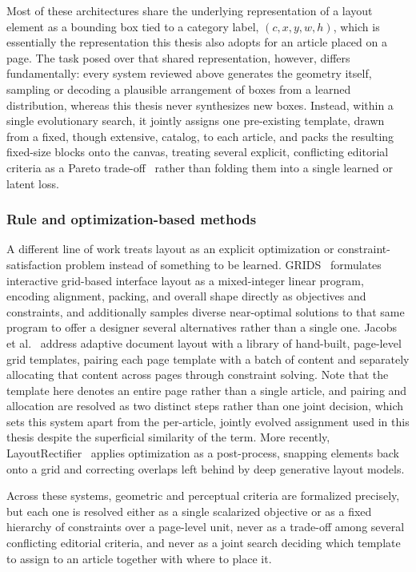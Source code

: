 Most of these architectures share the underlying representation of a layout element as a bounding box tied to a category label, $(c, x, y, w, h)$, which is essentially the representation this thesis also adopts for an article placed on a page. The task posed over that shared representation, however, differs fundamentally: every system reviewed above generates the geometry itself, sampling or decoding a plausible arrangement of boxes from a learned distribution, whereas this thesis never synthesizes new boxes. Instead, within a single evolutionary search, it jointly assigns one pre-existing template, drawn from a fixed, though extensive, catalog, to each article, and packs the resulting fixed-size blocks onto the canvas, treating several explicit, conflicting editorial criteria as a Pareto trade-off~\cite{pareto} rather than folding them into a single learned or latent loss.

\subsubsection{Rule and optimization-based methods}

A different line of work treats layout as an explicit optimization or constraint-satisfaction problem instead of something to be learned. GRIDS~\cite{Dayama-2020} formulates interactive grid-based interface layout as a mixed-integer linear program, encoding alignment, packing, and overall shape directly as objectives and constraints, and additionally samples diverse near-optimal solutions to that same program to offer a designer several alternatives rather than a single one. Jacobs et al.~\cite{jacobs-2003} address adaptive document layout with a library of hand-built, page-level grid templates, pairing each page template with a batch of content and separately allocating that content across pages through constraint solving. Note that the template here denotes an entire page rather than a single article, and pairing and allocation are resolved as two distinct steps rather than one joint decision, which sets this system apart from the per-article, jointly evolved assignment used in this thesis despite the superficial similarity of the term. More recently, LayoutRectifier~\cite{shen-2025} applies optimization as a post-process, snapping elements back onto a grid and correcting overlaps left behind by deep generative layout models.

Across these systems, geometric and perceptual criteria are formalized precisely, but each one is resolved either as a single scalarized objective or as a fixed hierarchy of constraints over a page-level unit, never as a trade-off among several conflicting editorial criteria, and never as a joint search deciding which template to assign to an article together with where to place it.

